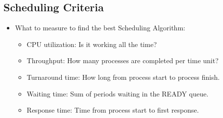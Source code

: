 \documentclass[a4wide,10pt]{article}
\begin{document}
\subsection{Scheduling Criteria} %
\label{sub:scheduling_criteria}
\begin{itemize}
	\item What to measure to find the best Scheduling Algorithm:
	\begin{itemize}
		\item CPU utilization: Is it working all the time?
		\item Throughput: How many processes are completed per time unit?
		\item Turnaround time: How long from process start to process finish.
		\item Waiting time: Sum of periods waiting in the READY queue.
		\item Response time: Time from process start to first response.
	\end{itemize}
\end{itemize}
\end{document}
